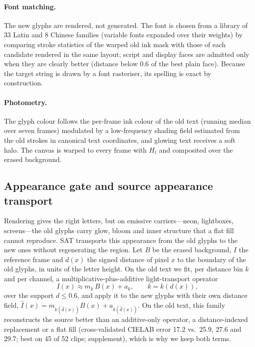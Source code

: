 \paragraph{Font matching.} The new glyphs are rendered, not generated. The font is chosen from a library of 33 Latin and 8 Chinese families (variable fonts expanded over their weights) by comparing stroke statistics of the warped old ink mask with those of each candidate rendered in the same layout; script and display faces are admitted only when they are clearly better (distance below 0.6 of the best plain face). Because the target string is drawn by a font rasteriser, its spelling is exact by construction.

\paragraph{Photometry.} The glyph colour follows the per-frame ink colour of the old text (running median over seven frames) modulated by a low-frequency shading field estimated from the old strokes in canonical text coordinates, and glowing text receives a soft halo. The canvas is warped to every frame with $H_t$ and composited over the erased background.

\subsection{Appearance gate and source appearance transport}
\label{sec:sat}
Rendering gives the right letters, but on emissive carriers---neon, lightboxes, screens---the old glyphs carry glow, bloom and inner structure that a flat fill cannot reproduce. SAT transports this appearance from the old glyphs to the new ones without regenerating the region. Let $B$ be the erased background, $I$ the reference frame and $d(x)$ the signed distance of pixel $x$ to the boundary of the old glyphs, in units of the letter height. On the old text we fit, per distance bin $k$ and per channel, a multiplicative-plus-additive light-transport operator
\begin{equation}
I(x)\approx m_k\,B(x)+a_k,\qquad k=k(d(x)),
\label{eq:sat}
\end{equation}
over the support $d\le0.6$, and apply it to the new glyphs with their own distance field, $\hat I(x)=m_{k(\hat d(x))}B(x)+a_{k(\hat d(x))}$. On the old text, this family reconstructs the source better than an additive-only operator, a distance-indexed replacement or a flat fill (cross-validated CIELAB error 17.2 vs.\ 25.9, 27.6 and 29.7; best on 45 of 52 clips; supplement), which is why we keep both terms.

